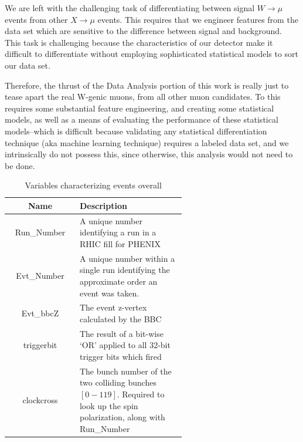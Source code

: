 We are left with the challenging task of differentiating between signal
$W\rightarrow\mu$ events from other $X\rightarrow\mu$ events. This requires that
we engineer features from the data set which are sensitive to the difference
between signal and background. This task is challenging because the
characteristics of our detector make it difficult to differentiate without
employing sophisticated statistical models to sort our data set.

Therefore, the thrust of the Data Analysis portion of this work is really just
to tease apart the real W-genic muons, from all other muon candidates. To this
requires some substantial feature engineering, and creating some statistical
models, as well as a means of evaluating the performance of these statistical
models--which is difficult because validating any statistical differentiation
technique (aka machine learning technique) requires a labeled data set, and we
intrinsically do not possess this, since otherwise, this analysis would not need
to be done.

\begin{table}
  \centering
  \begin{tabular}{c p{0.6\linewidth}}
      \toprule
      \textbf{Name} & \textbf{Description} \\
      \midrule
      Run\_Number & A unique number identifying a run in a RHIC fill for PHENIX \\
      Evt\_Number & A unique number within a single run identifying the approximate order an event was taken. \\
      Evt\_bbcZ & The event z-vertex calculated by the BBC \\
      triggerbit & The result of a bit-wise `OR' applied to all 32-bit trigger bits which fired \\
      clockcross & The bunch number of the two colliding bunches $[0-119]$. Required to look up the spin polarization, along with Run\_Number \\
      \bottomrule
    \end{tabular}
  \caption{Variables characterizing events overall}
  \label{tab:evt_variables}
\end{table}


